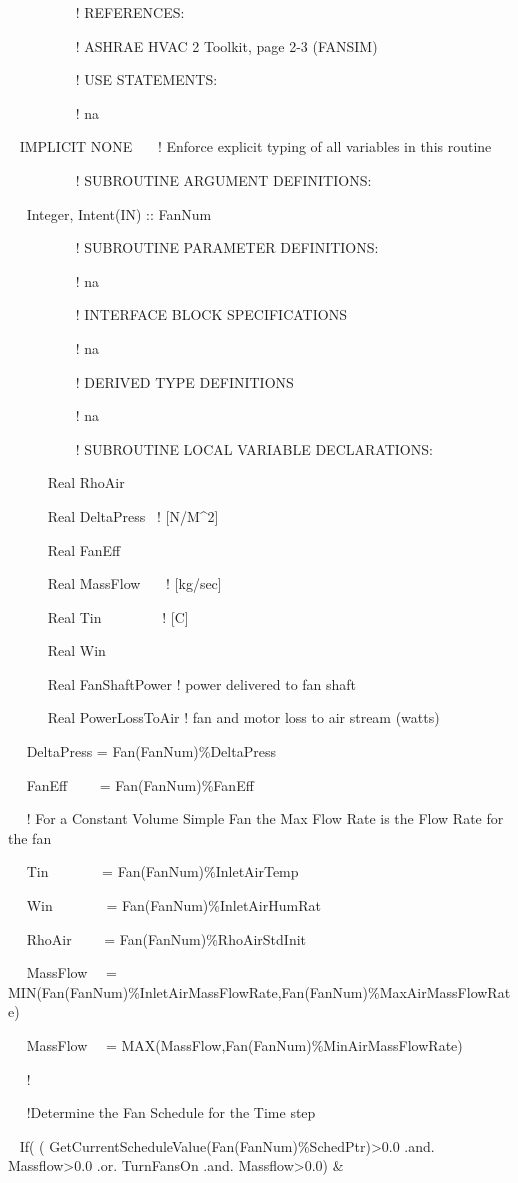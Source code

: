 ~~~~~~~~~ ! REFERENCES:

~~~~~~~~~ ! ASHRAE HVAC 2 Toolkit, page 2-3 (FANSIM)

~~~~~~~~~ ! USE STATEMENTS:

~~~~~~~~~ ! na

~ IMPLICIT NONE~~~ ! Enforce explicit typing of all variables in this routine

~~~~~~~~~ ! SUBROUTINE ARGUMENT DEFINITIONS:

~~ Integer, Intent(IN) :: FanNum

~~~~~~~~~ ! SUBROUTINE PARAMETER DEFINITIONS:

~~~~~~~~~ ! na

~~~~~~~~~ ! INTERFACE BLOCK SPECIFICATIONS

~~~~~~~~~ ! na

~~~~~~~~~ ! DERIVED TYPE DEFINITIONS

~~~~~~~~~ ! na

~~~~~~~~~ ! SUBROUTINE LOCAL VARIABLE DECLARATIONS:

~~~~~ Real RhoAir

~~~~~ Real DeltaPress~ ! {[}N/M\^{}2{]}

~~~~~ Real FanEff

~~~~~ Real MassFlow~~~ ! {[}kg/sec{]}

~~~~~ Real Tin~~~~~~~~ ! {[}C{]}

~~~~~ Real Win

~~~~~ Real FanShaftPower ! power delivered to fan shaft

~~~~~ Real PowerLossToAir ! fan and motor loss to air stream (watts)

~~ DeltaPress = Fan(FanNum)\%DeltaPress

~~ FanEff~~~~ = Fan(FanNum)\%FanEff

~~ ! For a Constant Volume Simple Fan the Max Flow Rate is the Flow Rate for the fan

~~ Tin~~~~~~~ = Fan(FanNum)\%InletAirTemp

~~ Win~~~~~~~ = Fan(FanNum)\%InletAirHumRat

~~ RhoAir~~~~ = Fan(FanNum)\%RhoAirStdInit

~~ MassFlow~~ = MIN(Fan(FanNum)\%InletAirMassFlowRate,Fan(FanNum)\%MaxAirMassFlowRate)

~~ MassFlow~~ = MAX(MassFlow,Fan(FanNum)\%MinAirMassFlowRate)

~~ !

~~ !Determine the Fan Schedule for the Time step

~ If( ( GetCurrentScheduleValue(Fan(FanNum)\%SchedPtr)\textgreater{}0.0 .and. Massflow\textgreater{}0.0 .or. TurnFansOn .and. Massflow\textgreater{}0.0) \&


